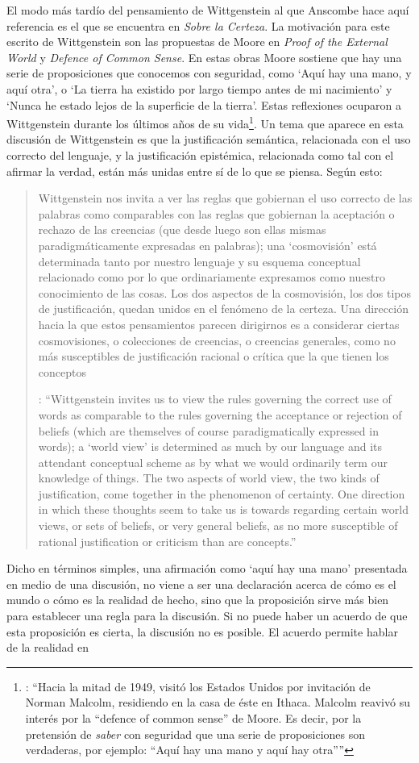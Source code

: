 El modo más tardío del pensamiento de Wittgenstein al que Anscombe hace aquí referencia es el que se encuentra en \emph{Sobre la Certeza}. La motivación para este escrito de Wittgenstein son las propuestas de Moore en \emph{Proof of the External World} y \emph{Defence of Common Sense}. En estas obras Moore sostiene que hay una serie de proposiciones que conocemos con seguridad, como \enquote*{Aquí hay una mano, y aquí otra}, o \enquote*{La tierra ha existido por largo tiempo antes de mi nacimiento} y \enquote*{Nunca he estado lejos de la superficie de la tierra}. Estas reflexiones ocuparon a Wittgenstein durante los últimos años de su vida\footnote{\cite[Cf.~][vi]{wittgenstein1969oncertes}: \enquote{Hacia la mitad de 1949, visitó los Estados Unidos por invitación de Norman Malcolm, residiendo en la casa de éste en Ithaca. Malcolm reavivó su interés por la ``defence of common sense'' de Moore. Es decir, por la pretensión de \emph{saber} con seguridad que una serie de proposiciones son verdaderas, por ejemplo: ``Aquí hay una mano y aquí hay otra''}}. Un tema que aparece en esta discusión de Wittgenstein es que la justificación semántica, relacionada con el uso correcto del lenguaje, y la justificación epistémica, relacionada como tal con el afirmar la verdad, están más unidas entre sí de lo que se piensa. Según esto:\blockquote[{\cite[213]{teichmann2008ans}}: \enquote{Wittgenstein invites us to view the rules governing the correct use of words as comparable to the rules governing the acceptance or rejection of beliefs (which are themselves of course paradigmatically expressed in words); a ‘world view’ is determined as much by our language and its attendant conceptual scheme as by what we would ordinarily term our knowledge of things. The two aspects of world view, the two kinds of justification, come together in the phenomenon of certainty. \textelp{} One direction in which these thoughts seem to take us is towards regarding certain world views, or sets of beliefs, or very general beliefs, as no more susceptible of rational justification or criticism than are concepts.}]{Wittgenstein nos invita a ver las reglas que gobiernan el uso correcto de las palabras como comparables con las reglas que gobiernan la aceptación o rechazo de las creencias (que desde luego son ellas mismas paradigmáticamente expresadas en palabras); una `cosmovisión' está determinada tanto por nuestro lenguaje y su esquema conceptual relacionado como por lo que ordinariamente expresamos como nuestro conocimiento de las cosas. Los dos aspectos de la cosmovisión, los dos tipos de justificación, quedan unidos en el fenómeno de la certeza. \textelp{} Una dirección hacia la que estos pensamientos parecen dirigirnos es a considerar ciertas cosmovisiones, o colecciones de creencias, o creencias generales, como no más susceptibles de justificación racional o crítica que la que tienen los conceptos}. Dicho en términos simples, una afirmación como \enquote*{aquí hay una mano} presentada en medio de una discusión, no viene a ser una declaración acerca de cómo es el mundo o cómo es la realidad de hecho, sino que la proposición sirve más bien para establecer una regla para la discusión. Si no puede haber un acuerdo de que esta proposición es cierta, la discusión no es posible. El acuerdo permite hablar de la realidad en 